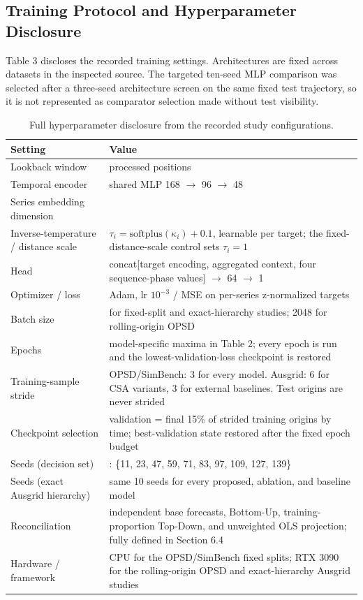 \documentclass[electronics,article,submit,moreauthors]{Definitions/mdpi}
\begin{document}
\subsection{Training Protocol and Hyperparameter Disclosure}\label{training-protocol-and-hyperparameter-disclosure}

Table 3 discloses the recorded training settings. Architectures are fixed across datasets in the inspected source. The targeted ten-seed MLP comparison was selected after a three-seed architecture screen on the same fixed test trajectory, so it is not represented as comparator selection made without test visibility.

\begin{table}[t]
\centering
\scriptsize
\setlength{\tabcolsep}{3pt}
\caption{Full hyperparameter disclosure from the recorded study configurations.}\label{tab:3}
\begin{tabularx}{\textwidth}{@{}>{\raggedright\arraybackslash}X >{\raggedright\arraybackslash}X@{}}
\toprule
Setting & Value \\
\midrule
Lookback window & 168 processed positions \\
Temporal encoder & shared MLP 168 $\rightarrow$ 96 $\rightarrow$ 48 \\
Series embedding dimension & 8 \\
Inverse-temperature / distance scale & $\tau_i=\mathrm{softplus}(\kappa_i) + 0.1$, learnable per target; the fixed-distance-scale control sets $\tau_i=1$ \\
Head & concat[target encoding, aggregated context, four sequence-phase values] $\rightarrow$ 64 $\rightarrow$ 1 \\
Optimizer / loss & Adam, lr $10^{-3}$ / MSE on per-series z-normalized targets \\
Batch size & 512 for fixed-split and exact-hierarchy studies; 2048 for rolling-origin OPSD \\
Epochs & model-specific maxima in Table 2; every epoch is run and the lowest-validation-loss checkpoint is restored \\
Training-sample stride & OPSD/SimBench: 3 for every model. Ausgrid: 6 for CSA variants, 3 for external baselines. Test origins are never strided \\
Checkpoint selection & validation = final 15\% of strided training origins by time; best-validation state restored after the fixed epoch budget \\
Seeds (decision set) & 10: \{11, 23, 47, 59, 71, 83, 97, 109, 127, 139\} \\
Seeds (exact Ausgrid hierarchy) & same 10 seeds for every proposed, ablation, and baseline model \\
Reconciliation & independent base forecasts, Bottom-Up, training-proportion Top-Down, and unweighted OLS projection; fully defined in Section 6.4 \\
Hardware / framework & CPU for the OPSD/SimBench fixed splits; RTX 3090 for the rolling-origin OPSD and exact-hierarchy Ausgrid studies \\
\bottomrule
\end{tabularx}
\end{table}
\end{document}
